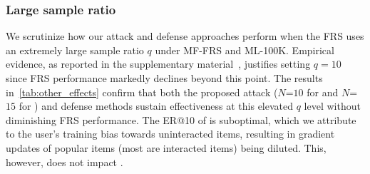 \subsubsection{Large sample ratio}
We scrutinize how our attack and defense approaches perform when the FRS uses an extremely large sample ratio $q$ under MF-FRS and ML-100K.
Empirical evidence, as reported in the supplementary material~\cite{github-pieck-supple}, justifies setting $q=10$ since FRS performance markedly declines beyond this point.
The results in~\cref{tab:other_effects} confirm that both the proposed attack ($N$=$10$ for \modelI{} and $N$=$15$ for \modelII{}) and defense methods sustain effectiveness at this elevated $q$ level without diminishing FRS performance.
The ER@10 of \modelI{} is suboptimal, which we attribute to the user's training bias towards uninteracted items, resulting in gradient updates of popular items (most are interacted items) being diluted. This, however, does not impact \modelII{}.




